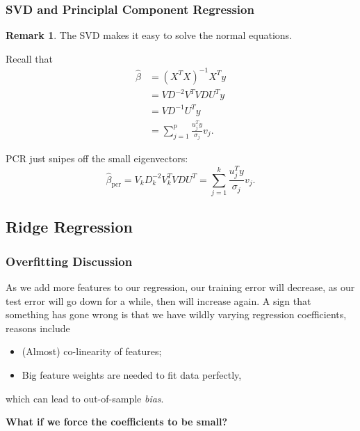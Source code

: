 \documentclass[11pt]{article}
\theoremstyle{definition}
\newtheorem{remark}{Remark}[section]
\numberwithin{equation}{section}
\begin{document}
\subsubsection{SVD and Principlal Component Regression}
\begin{remark}
  The SVD makes it easy to solve the normal equations.

  Recall that
  \begin{align}
    \hat\beta &= (X^TX)^{-1}X^Ty\\
    &=VD^{-2}V^TVDU^Ty\\
    &=VD^{-1}U^Ty\\
    &=\sum^p_{j=1}\frac{u_j^T y}{\sigma_j}v_j.
  \end{align}

  PCR just snipes off the small eigenvectors:
  \begin{equation}
    \hat\beta_{\text{pcr}}=V_kD_k^{-2}V_k^TVDU^T=\sum^k_{j=1}\frac{u_j^Ty}{\sigma_j}v_j.
  \end{equation}
\end{remark}

\subsection{Ridge Regression}

\subsubsection{Overfitting Discussion}

As we add more features to our regression, our training error will decrease, as our test error will go down for a while, then will increase again. A sign that something has gone wrong is that we have wildly varying regression coefficients, reasons include
\begin{itemize}
  \item (Almost) co-linearity of features;
  \item Big feature weights are needed to fit data perfectly,
\end{itemize}

which can lead to out-of-sample \textit{bias}.

\textbf{What if we force the coefficients to be small?}
\end{document}
